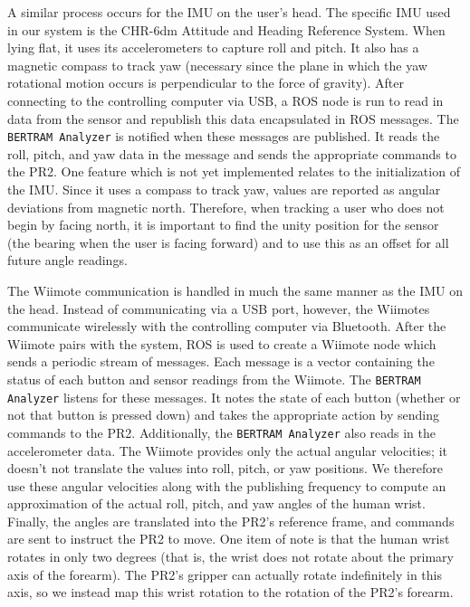 \documentclass{sig-alternate}
\begin{document}
A similar process occurs for the IMU on the user's head. The specific IMU used in our system is
the CHR-6dm Attitude and Heading Reference System. When lying flat, it uses its
accelerometers to capture roll and pitch. It also has a magnetic compass to 
track yaw (necessary since the plane in which the yaw rotational motion occurs
is perpendicular to the force of gravity). After connecting to the 
controlling computer via 
USB, a ROS node is run to read in data from the sensor and republish this data
encapsulated in ROS messages. The {\tt BERTRAM Analyzer} is notified when these
messages are published. It reads the roll, pitch, and yaw data in the message
and sends the appropriate commands to the PR2. One feature which is not yet
implemented relates to the initialization of the IMU. Since it uses a compass
to track yaw, values are reported as angular deviations from magnetic north.
Therefore, when tracking a user who does not begin by facing north, it is 
important to find the unity position for the sensor (the bearing when 
the user is facing forward) and to use this as an offset for all future angle
readings.

The Wiimote communication is handled in much the same manner as the IMU on the head.
Instead of communicating via a USB port, however, the Wiimotes communicate wirelessly with the
controlling computer via Bluetooth. After the Wiimote pairs with the system,
ROS is used to create a Wiimote node which 
sends a periodic stream of messages. Each message is a vector containing the
status of each button and sensor readings from the Wiimote. The {\tt BERTRAM Analyzer}
listens for these messages. It notes the state of each button (whether or not that button
is pressed down)
and takes the appropriate action by sending commands to the PR2. Additionally, 
the {\tt BERTRAM Analyzer} also reads in the accelerometer data. The Wiimote
provides only the actual angular velocities; it doesn't not translate the 
values into roll, pitch, or yaw positions. We therefore use these angular velocities along 
with the publishing frequency to compute an approximation of the actual roll, pitch,
and yaw angles of the human wrist. Finally, the angles are translated into the PR2's
reference frame, and commands are sent to instruct the PR2 to move. One 
item of note is that the human wrist rotates in only two degrees (that is,
the wrist does not rotate about the primary axis of the forearm). The PR2's 
gripper can actually rotate indefinitely in this axis, so we instead map this wrist rotation 
to the rotation of the PR2's forearm.
\end{document}
